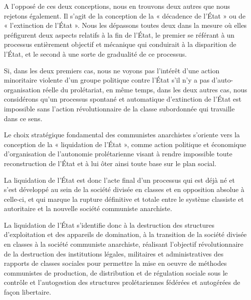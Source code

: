 A l'opposé de ces deux conceptions, nous en trouvons deux autres que nous rejetons également. Il s'agit de la conception de la « décadence de l'État » ou de « l'extinction de l'État ». Nous les dépassons toutes deux dans la mesure où elles préfigurent deux aspects relatifs à la fin de l'État, le premier se référant à un processus entièrement objectif et mécanique qui conduirait à la disparition de l'État, et le second à une sorte de gradualité de ce processus.

Si, dans les deux premiers cas, nous ne voyons pas l'intérêt d'une action minoritaire violente d'un groupe politique contre l'État s'il n'y a pas d'auto-organisation réelle du prolétariat, en même temps, dans les deux autres cas, nous considérons qu'un processus spontané et automatique d'extinction de l'État est impossible sans l'action révolutionnaire de la classe subordonnée qui travaille dans ce sens.

Le choix stratégique fondamental des communistes anarchistes s'oriente vers la conception de la « liquidation de l'État », comme action politique et économique d'organisation de l'autonomie prolétarienne visant à rendre impossible toute reconstruction de l'État et à lui ôter ainsi toute base sur le plan social.

La liquidation de l'État est donc l'acte final d'un processus qui est déjà né et s'est développé au sein de la société divisée en classes et en opposition absolue à celle-ci, et qui marque la rupture définitive et totale entre le système classiste et autoritaire et la nouvelle société communiste anarchiste.

La liquidation de l'État s'identifie donc à la destruction des structures d'exploitation et des appareils de domination, à la transition de la société divisée en classes à la société communiste anarchiste, réalisant l'objectif révolutionnaire de la destruction des institutions légales, militaires et administratives des rapports de classes sociales pour permettre la mise en oeuvre de méthodes communistes de production, de distribution et de régulation sociale sous le contrôle et l'autogestion des structures prolétariennes fédérées et autogérées de façon libertaire.

